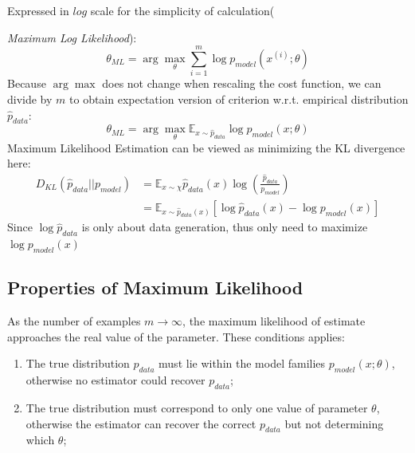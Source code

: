 \documentclass{article}
\newcommand{\argmax}{\arg\!\max}
\begin{document}
Expressed in $log$ scale for the simplicity of calculation({\emph{Maximum Log Likelihood}):
\[ \theta_{ML} = \argmax_\theta \sum_{i=1}^{m}\log p_{model}(x^{(i)};\theta)\]
Because $\argmax$ does not change when rescaling the cost function, we can divide by $m$ to obtain expectation version of criterion w.r.t. empirical distribution $\hat{p}_{data}$:
\[
    \theta_{ML} = \argmax_\theta \mathbb{E}_{x\sim\hat{p}_{data}} \log p_{model}(x;\theta)    
\]
Maximum Likelihood Estimation can be viewed as minimizing the KL divergence here:
\begin{align*}
\textit{D}_{KL}(\hat{p}_{data}||p_{model}) &= \mathbb{E}_{x\sim \mathcal{\chi}}\hat{p}_{data}(x) \log(\frac{\hat{p}_{data}}{p_{model}})\\
						   &= \mathbb{E}_{x\sim\hat{p}_{data}(x)}[\log\hat{p}_{data}(x) - \log p_{model}(x)]    
\end{align*}
Since $\log\hat{p}_{data}$ is only about data generation, thus only need to maximize $\log p_{model}(x)$
\subsection*{Properties of Maximum Likelihood}
As the number of examples $m \rightarrow \infty$, the maximum likelihood of estimate approaches the real value of the parameter. These conditions applies:
\begin{enumerate}
    \item The true distribution $p_{data}$ must lie within the model families $p_{model}(x;\theta)$, otherwise no estimator could recover $p_{data}$;
    \item The true distribution must correspond to only one value of parameter $\theta$, otherwise the estimator can recover the correct $p_{data}$ but not determining which $\theta$;
\end{enumerate}
}
\end{document}
